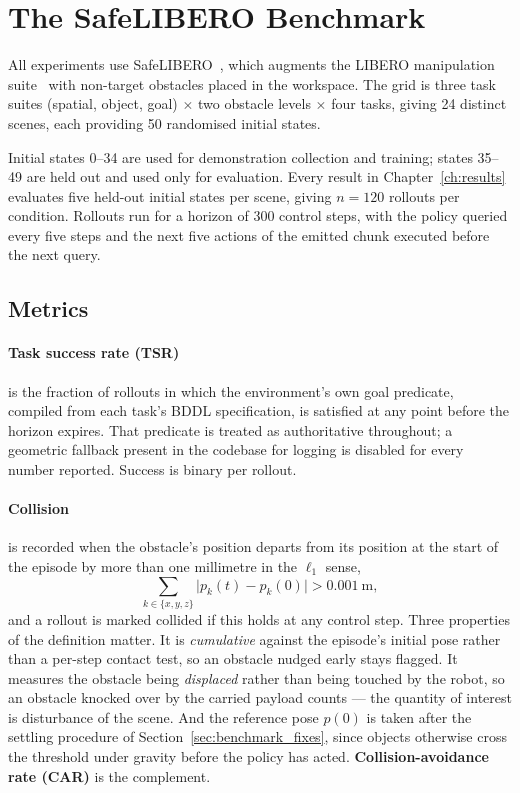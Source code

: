 \documentclass[a4paper,11pt]{report}
\begin{document}
\section{The SafeLIBERO Benchmark}\label{sec:benchmark}

All experiments use SafeLIBERO~\cite{vlsa2026}, which augments the LIBERO manipulation
suite~\cite{liu2023libero} with non-target obstacles placed in the workspace. The grid is three
task suites (spatial, object, goal) $\times$ two obstacle levels $\times$ four tasks, giving 24
distinct scenes, each providing 50 randomised initial states.

Initial states 0--34 are used for demonstration collection and training; states 35--49 are held out
and used only for evaluation. Every result in Chapter~\ref{ch:results} evaluates five held-out
initial states per scene, giving $n = 120$ rollouts per condition. Rollouts run for a horizon of
300 control steps, with the policy queried every five steps and the next five actions of the
emitted chunk executed before the next query.

\subsection{Metrics}\label{sec:metrics}

\paragraph{Task success rate (TSR)} is the fraction of rollouts in which the environment's own goal
predicate, compiled from each task's BDDL specification, is satisfied at any point before the
horizon expires. That predicate is treated as authoritative throughout; a geometric fallback
present in the codebase for logging is disabled for every number reported. Success is binary per
rollout.

\paragraph{Collision} is recorded when the obstacle's position departs from its position at the
start of the episode by more than one millimetre in the $\ell_1$ sense,
\begin{equation}
  \sum_{k \in \{x,y,z\}} \bigl| p_k(t) - p_k(0) \bigr| > 0.001~\mathrm{m},
  \label{eq:collision}
\end{equation}
and a rollout is marked collided if this holds at any control step. Three properties of the
definition matter. It is \emph{cumulative} against the episode's initial pose rather than a
per-step contact test, so an obstacle nudged early stays flagged. It measures the obstacle being
\emph{displaced} rather than being touched by the robot, so an obstacle knocked over by the carried
payload counts --- the quantity of interest is disturbance of the scene. And the reference pose
$p(0)$ is taken after the settling procedure of Section~\ref{sec:benchmark_fixes}, since objects
otherwise cross the threshold under gravity before the policy has acted.
\textbf{Collision-avoidance rate (CAR)} is the complement.
\end{document}
